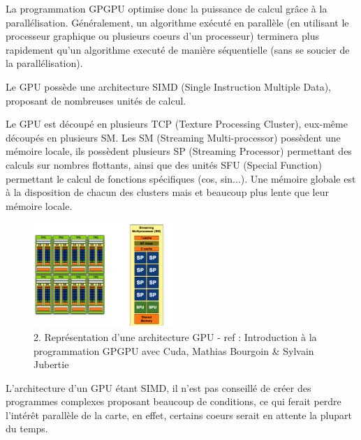 \documentclass{report}
\begin{document}
La programmation GPGPU optimise donc la puissance de calcul grâce à la parallélisation. Généralement, un algorithme exécuté en parallèle (en utilisant le processeur graphique ou plusieurs coeurs d'un processeur) terminera plus rapidement qu'un algorithme executé de manière séquentielle (sans se soucier de la parallélisation).  \newline

Le GPU possède une architecture SIMD (Single Instruction Multiple Data), proposant de nombreuses unités de calcul. \newline

Le GPU est découpé en plusieurs TCP (Texture Processing Cluster), eux-même découpés en plusieurs SM. Les SM (Streaming Multi-processor) possèdent une mémoire locale, ils possèdent plusieurs SP (Streaming Processor) permettant des calculs sur nombres flottants, ainsi que des unités SFU (Special Function) permettant le calcul de fonctions spécifiques (cos, sin...). Une mémoire globale est à la disposition de chacun des clusters mais et beaucoup plus lente que leur mémoire locale. \newline

\begin{figure}[!h]
\begin{center}
\includegraphics[height=150]{image2.png}
\end{center}
\caption{2. Représentation d'une architecture GPU - ref : Introduction à la programmation GPGPU avec Cuda, Mathias Bourgoin & Sylvain Jubertie}
\label{test}
\end{figure} \newline

L'architecture d'un GPU étant SIMD, il n'est pas conseillé de créer des programmes complexes proposant beaucoup de conditions, ce qui ferait perdre l'intérêt parallèle de la carte, en effet, certains coeurs serait en attente la plupart du temps.
\end{document}
